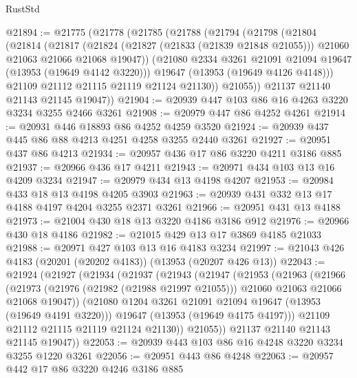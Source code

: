 \begin{lexlean}{RustStd}
\begin{coremodule}
@21894 := @21775
    (@21778
      (@21785
        (@21788
          (@21794
            (@21798
              (@21804
                (@21814
                  (@21817
                    (@21824
                      (@21827 (@21833 (@21839 @21848 @21055)))
                      @21060
                      @21063
                      @21066
                      @21068
                      @19047))
                  (@21080 @2334 @3261 @21091 @21094 @19647 (@13953 (@19649 @4142 @3220)))
                  @19647
                  (@13953 (@19649 @4126 @4148)))
                @21109
                @21112
                @21115
                @21119
                @21124
                @21130))
            @21055))
        @21137
        @21140
        @21143
        @21145
        @19047))
@21904 := @20939 @447 @103 @86 @16 @4263 @3220 @3234 @3255 @2466 @3261
@21908 := @20979 @447 @86 @4252 @4261
@21914 := @20931 @446 @18893 @86 @4252 @4259 @3520
@21924 := @20939 @437 @445 @86 @88 @4213 @4251 @4258 @3255 @2440 @3261
@21927 := @20951 @437 @86 @4213
@21934 := @20957 @436 @17 @86 @3220 @4211 @3186 @885
@21937 := @20966 @436 @17 @4211
@21943 := @20971 @434 @103 @13 @16 @4209 @3234
@21947 := @20979 @434 @13 @4198 @4207
@21953 := @20984 @433 @18 @13 @4198 @4205 @3903
@21963 := @20939 @431 @332 @13 @17 @4188 @4197 @4204 @3255 @2371 @3261
@21966 := @20951 @431 @13 @4188
@21973 := @21004 @430 @18 @13 @3220 @4186 @3186 @912
@21976 := @20966 @430 @18 @4186
@21982 := @21015 @429 @13 @17 @3869 @4185 @21033
@21988 := @20971 @427 @103 @13 @16 @4183 @3234
@21997 := @21043 @426 @4183 (@20201 (@20202 @4183)) (@13953 (@20207 @426 @13))
@22043 := @21924
    (@21927
      (@21934
        (@21937
          (@21943
            (@21947
              (@21953
                (@21963
                  (@21966
                    (@21973
                      (@21976 (@21982 (@21988 @21997 @21055)))
                      @21060
                      @21063
                      @21066
                      @21068
                      @19047))
                  (@21080 @1204 @3261 @21091 @21094 @19647 (@13953 (@19649 @4191 @3220)))
                  @19647
                  (@13953 (@19649 @4175 @4197)))
                @21109
                @21112
                @21115
                @21119
                @21124
                @21130))
            @21055))
        @21137
        @21140
        @21143
        @21145
        @19047))
@22053 := @20939 @443 @103 @86 @16 @4248 @3220 @3234 @3255 @1220 @3261
@22056 := @20951 @443 @86 @4248
@22063 := @20957 @442 @17 @86 @3220 @4246 @3186 @885

\end{coremodule}
\end{lexlean}
